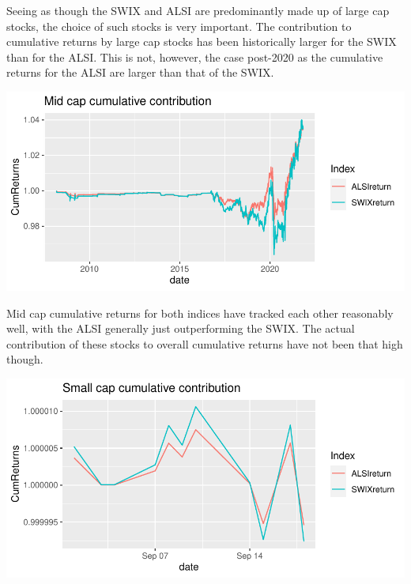 \documentclass[11pt,preprint, authoryear]{elsarticle}
\let\origfigure\figure
\let\endorigfigure\endfigure
\renewenvironment{figure}[1][2] {
    \expandafter\origfigure\expandafter[H]
} {
    \endorigfigure
}
\numberwithin{equation}{section}
\numberwithin{figure}{section}
\numberwithin{table}{section}
\begin{document}
Seeing as though the SWIX and ALSI are predominantly made up of large
cap stocks, the choice of such stocks is very important. The
contribution to cumulative returns by large cap stocks has been
historically larger for the SWIX than for the ALSI. This is not,
however, the case post-2020 as the cumulative returns for the ALSI are
larger than that of the SWIX.

\begin{figure}[H]

{\centering \includegraphics{Question3_files/figure-latex/Figure4-1} 

}

\caption{Mid caps \label{Figure4}}\label{fig:Figure4}
\end{figure}

Mid cap cumulative returns for both indices have tracked each other
reasonably well, with the ALSI generally just outperforming the SWIX.
The actual contribution of these stocks to overall cumulative returns
have not been that high though.

\begin{figure}[H]

{\centering \includegraphics{Question3_files/figure-latex/Figure5-1} 

}

\caption{Small caps \label{Figure5}}\label{fig:Figure5}
\end{figure}
\end{document}
